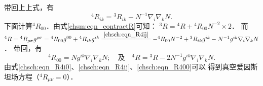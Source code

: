 带回上上式，有
\begin{equation}\label{chsch:eqn_R4ij}
    {}^{4}{R}_{ik}  ={}^{3} {R}_{ik} -  N^{-1} \nabla_i \nabla_k N .
\end{equation}
下面计算${}^{4}R_{00}$．由式\eqref{chsm:eqn_contractR}可知：
$ {}^{3}{R}={}^{4}{R}+ {}^{4}{R}_{00}  N^{-2} \times 2 $．
而
$    {}^{4}{R} =  {}^{4}R_{\rho\sigma} g^{\rho\sigma}
    = {}^{4}R_{00} g^{00} +  {}^{4}R_{ik}g^{ik}
    \xlongequal{\ref{chsch:eqn_R4ij}} - {}^{4} R_{00}N^{-2} 
    + {}^{3} {R}_{ik} g^{ik} -  N^{-1} g^{ik} \nabla_i \nabla_k N $．
带回，有
\begin{equation}\label{chsch:eqn_R400}
    {}^{4}{R}_{00}  =   N g^{ik} \nabla_i \nabla_k N ;    \quad\text{及}\quad
    {}^{4}{R}={}^{3}{R} - 2N^{-1}g^{ik} \nabla_i \nabla_k  N  .
\end{equation}
由式\eqref{chsch:eqn_R4i0}、\eqref{chsch:eqn_R4ij}、\eqref{chsch:eqn_R400}可以
得到真空爱因斯坦场方程（${}^{4}R_{\mu\nu}=0$）．

